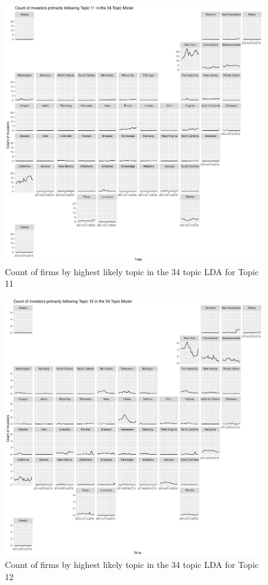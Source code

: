 		\begin{figure}
		\centering
		\includegraphics[width=1\linewidth]{Figures/ChapterV/USA_34_Topic11.pdf}
		\caption[Count of firm for Topic 11 by quarter]{Count of firms by highest likely topic in the 34 topic LDA for Topic 11}
		\label{fig:StateLDA11}
	\end{figure}
	
		\begin{figure}
		\centering
		\includegraphics[width=1\linewidth]{Figures/ChapterV/USA_34_Topic12.pdf}
		\caption[Count of firm for Topic 12 by quarter]{Count of firms by highest likely topic in the 34 topic LDA for Topic 12}
		\label{fig:StateLDA12}
	\end{figure}
	

